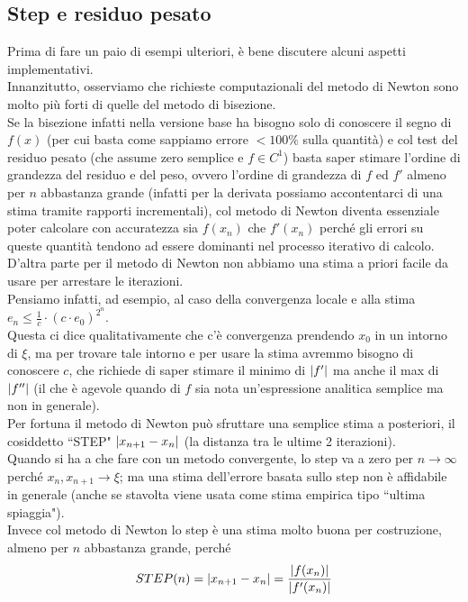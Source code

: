 \documentclass[12pt]{article}
\DeclarePairedDelimiter{\abs}{\lvert}{\rvert}
\begin{document}
\subsection{Step e residuo pesato}
Prima di fare un paio di esempi ulteriori, è bene discutere alcuni aspetti implementativi.\\
Innanzitutto, osserviamo che richieste computazionali del metodo di Newton sono molto più forti di quelle del metodo di bisezione.\\
Se la bisezione infatti nella versione base ha bisogno solo di conoscere il segno di $f(x)$ (per cui basta come sappiamo errore $< 100\%$ sulla quantità) e col test del residuo pesato (che assume zero semplice e $f \in C^1$) basta saper stimare l'ordine di grandezza del residuo e del peso, ovvero l'ordine di grandezza di $f$ ed $f'$ almeno per $n$ abbastanza grande (infatti per la derivata possiamo accontentarci di una stima tramite rapporti incrementali), col metodo di Newton diventa essenziale poter calcolare con accuratezza sia $f(x_n)$ che $f'(x_n)$ perché gli errori su queste quantità tendono ad essere dominanti nel processo iterativo di calcolo. \\
D'altra parte per il metodo di Newton non abbiamo una stima a priori facile da usare per arrestare le iterazioni.\\
Pensiamo infatti, ad esempio, al caso della convergenza locale e alla stima $e_n \leq \frac{1}{c} \cdot (c\cdot e_0)^{2^n}$.\\
Questa ci dice qualitativamente che c'è convergenza prendendo $x_0$ in un intorno di $\xi$, ma per trovare tale intorno e per usare la stima avremmo bisogno di conoscere $c$, che richiede di saper stimare il minimo di $\abs{f'}$ ma anche il max di $\abs{f''}$ (il che è agevole quando di $f$ sia nota un'espressione analitica semplice ma non in generale).\\
Per fortuna il metodo di Newton può sfruttare una semplice stima a posteriori, il cosiddetto ``STEP" $\abs{x_{n+1} - x_n}$ (la distanza tra le ultime 2 iterazioni).\\
Quando si ha a che fare con un metodo convergente, lo step va a zero per $n \to \infty$ perché $x_n, x_{n+1} \to \xi$; ma una stima dell'errore basata sullo step non è affidabile in generale (anche se stavolta viene usata come stima empirica tipo ``ultima spiaggia").\\
Invece col metodo di Newton lo step è una stima molto buona per costruzione, almeno per $n$ abbastanza grande, perché
\[ STEP(n) = \abs{x_{n+1} - x_n} = \frac{\abs{f(x_n)}}{\abs{f'(x_n)}} \]
\end{document}
